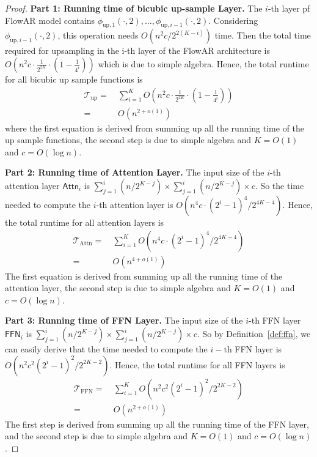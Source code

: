 \begin{proof}
    {\bf Part 1: Running time of bicubic up-sample Layer.} The $i$-th layer pf FlowAR model contains $\phi_{\mathrm{up},1}(\cdot,2),\dots,\phi_{\mathrm{up},i-1}(\cdot,2)$. Considering $\phi_{\mathrm{up},i-1}(\cdot,2)$, this operation needs $O(n^{2}c/2^{2(K-i)})$ time. Then the total time required for upsampling in the i-th layer of the FlowAR architecture is $O( n^2 c \cdot \frac{1}{2^{2K}} \cdot (1 - \frac{1}{4^i}))$ which is due to simple algebra. Hence, the total runtime for all bicubic up sample functions is
    \begin{align*}
        \mathcal{T}_{\mathrm{up}} = &~ \sum_{i=1}^K O( n^2 c \cdot \frac{1}{2^{2K}} \cdot (1 - \frac{1}{4^i}))\\
        =&~ O(n^{2+o(1)})
    \end{align*}
    where the first equation is derived from summing up all the running time of the up sample functions, the second step is due to simple algebra and $K = O(1)$ and $c = O(\log n)$.

    {\bf Part 2: Running time of Attention Layer.} The input size of the $i$-th attention layer $\mathsf{Attn}_i$ is $\sum_{j=1}^i (n/2^{K-j}) \times \sum_{j=1}^i(n/2^{K-j}) \times c $. So the time needed to compute the $i$-th attention layer is $O(n^4c \cdot (2^i-1)^4/2^{4K-4})$. Hence, the total runtime for all attention layers is
    \begin{align*}
        \mathcal{T}_{\mathrm{Attn}} =&~ \sum_{i=1}^K O( n^4c \cdot (2^i-1)^4/2^{4K-4})\\
        =&~ O(n^{4+o(1)})
    \end{align*}
    The first equation is derived from summing up all the running time of the attention layer, the second step is due to simple algebra and $K = O(1)$ and $c = O(\log n)$.

    {\bf Part 3: Running time of FFN Layer.} The input size of the $i$-th FFN layer $\mathsf{FFN}_i$ is $\sum_{j=1}^i (n/2^{K-j}) \times \sum_{j=1}^i(n/2^{K-j}) \times c $. So by Definition~\ref{def:ffn}, we can easily derive that the time needed to compute the $i-$th FFN layer is $O(n^2c^2 (2^i-1)^2/2^{2K-2} )$. Hence, the total runtime for all FFN layers is
    \begin{align*}
        \mathcal{T}_{\mathrm{FFN}} = &~ \sum_{i=1}^K O(n^2c^2 (2^i-1)^2/2^{2K-2}) \\
        =&~ O(n^{2+o(1)})
    \end{align*}
    The first step is derived from summing up all the running time of the FFN layer,  and the second step is due to simple algebra and $K = O(1)$ and $c = O(\log n)$.


\end{proof}
